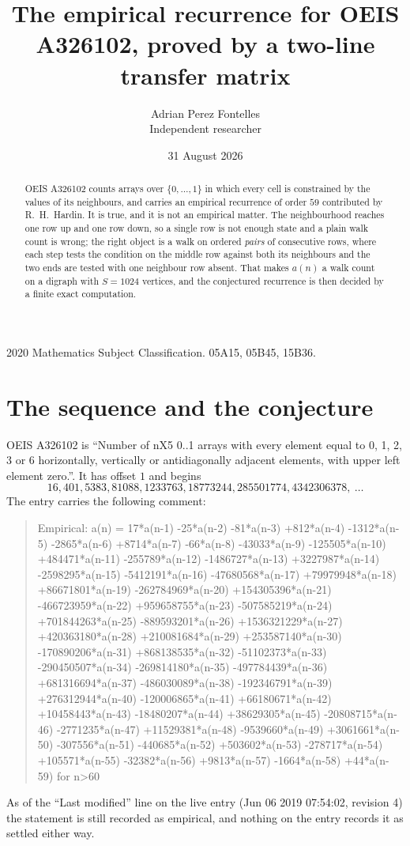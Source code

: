 \documentclass[11pt,a4paper]{article}
\title{The empirical recurrence for OEIS A326102, proved by a two-line transfer matrix}
\author{Adrian Perez Fontelles\\ \small Independent researcher}
\date{31 August 2026}
\theoremstyle{plain}
\theoremstyle{definition}
\begin{document}
\maketitle

\begin{abstract}
OEIS A326102 counts arrays over $\{0,\dots,1\}$ in which every cell is constrained by the
values of its neighbours, and carries an empirical recurrence of order $59$ contributed
by R.~H.~Hardin. It is true, and it is not an empirical matter. The neighbourhood reaches one
row up and one row down, so a single row is not enough state and a plain walk count
is wrong; the right object is a walk on ordered \emph{pairs} of consecutive rows, where
each step tests the condition on the middle row against both its neighbours and the two
ends are tested with one neighbour row absent. That makes $a(n)$ a walk count on a digraph
with $S=1024$ vertices, and the conjectured recurrence is then decided by a finite exact
computation.
\end{abstract}

\noindent\small 2020 Mathematics Subject Classification. 05A15, 05B45, 15B36.\normalsize

\section{The sequence and the conjecture}

OEIS A326102 is ``Number of nX5 0..1 arrays with every element equal to 0, 1, 2, 3 or 6 horizontally, vertically or antidiagonally adjacent elements, with upper left element zero.''. It has offset $1$ and begins
\[
16, 401, 5383, 81088, 1233763, 18773244, 285501774, 4342306378,\ \dots
\]
The entry carries the following comment:
\begin{quote}\small
Empirical: a(n) = 17*a(n-1) -25*a(n-2) -81*a(n-3) +812*a(n-4) -1312*a(n-5) -2865*a(n-6) +8714*a(n-7) -66*a(n-8) -43033*a(n-9) -125505*a(n-10) +484471*a(n-11) -255789*a(n-12) -1486727*a(n-13) +3227987*a(n-14) -2598295*a(n-15) -5412191*a(n-16) -47680568*a(n-17) +79979948*a(n-18) +86671801*a(n-19) -262784969*a(n-20) +154305396*a(n-21) -466723959*a(n-22) +959658755*a(n-23) -507585219*a(n-24) +701844263*a(n-25) -889593201*a(n-26) +1536321229*a(n-27) +420363180*a(n-28) +210081684*a(n-29) +253587140*a(n-30) -170890206*a(n-31) +868138535*a(n-32) -51102373*a(n-33) -290450507*a(n-34) -269814180*a(n-35) -497784439*a(n-36) +681316694*a(n-37) -486030089*a(n-38) -192346791*a(n-39) +276312944*a(n-40) -120006865*a(n-41) +66180671*a(n-42) +10458443*a(n-43) -18480207*a(n-44) +38629305*a(n-45) -20808715*a(n-46) -2771235*a(n-47) +11529381*a(n-48) -9539660*a(n-49) +3061661*a(n-50) -307556*a(n-51) -440685*a(n-52) +503602*a(n-53) -278717*a(n-54) +105571*a(n-55) -32382*a(n-56) +9813*a(n-57) -1664*a(n-58) +44*a(n-59) for n>60
\end{quote}
As of the ``Last modified'' line on the live entry (Jun 06 2019 07:54:02, revision 4) the statement is
still recorded as empirical, and nothing on the entry records it as settled either way.
\end{document}
